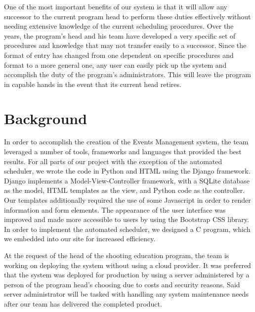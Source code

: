 \documentclass[sigconf]{acmart}
\begin{document}
One of the most important benefits of our system is that it will allow any successor to the current program head to perform these duties effectively without needing extensive knowledge of the current scheduling procedures. Over the years, the program's head and his team have developed a very specific set of procedures and knowledge that may not transfer easily to a successor. Since the format of entry has changed from one dependent on specific procedures and format to a more general one, any user can easily pick up the system and accomplish the duty of the program's administrators. This will leave the program in capable hands in the event that its current head retires.

\section{Background}%
  
In order to accomplish the creation of the Events Management system, the team leveraged a number of tools, frameworks and languages that provided the best results. For all parts of our project with the exception of the automated scheduler, we wrote the code in Python and HTML using the Django framework. Django implements a Model-View-Controller framework, with a SQLite database as the model, HTML templates as the view, and Python code as the controller. Our templates additionally required the use of some Javascript in order to render information and form elements. The appearance of the user interface was improved and made more accessible to users by using the Bootstrap CSS library. In order to implement the automated scheduler, we designed a C program, which we embedded into our site for increased efficiency.


At the request of the head of the shooting education program, the team is working on deploying the system without using a cloud provider. It was preferred that the system was deployed for production by using a server administered by a person of the program head's choosing due to costs and security reasons. Said server administrator will be tasked with handling any system maintenance needs after our team has delivered the completed product.
\end{document}
